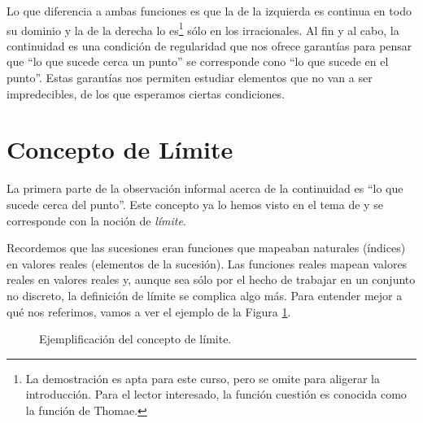 \documentclass[10pt,a4paper,openright]{book}
\theoremstyle{break}
\begin{document}
Lo que diferencia a ambas funciones es que la de la izquierda es continua en todo su dominio y la de la derecha lo es\footnote{La demostración es apta para este curso, pero se omite para aligerar la introducción. Para el lector interesado, la función cuestión es conocida como la función de Thomae.} sólo en los irracionales. Al fin y al cabo, la continuidad es una condición de regularidad que nos ofrece garantías para pensar que ``lo que sucede cerca un punto'' se corresponde cono ``lo que sucede en el punto''. Estas garantías nos permiten estudiar elementos que no van a ser impredecibles, de los que esperamos ciertas condiciones.

\section{Concepto de Límite}
La primera parte de la observación informal acerca de la continuidad es ``lo que sucede cerca del punto''. Este concepto ya lo hemos visto en el tema de  y se corresponde con la noción de \textit{límite}.

Recordemos que las sucesiones eran funciones que mapeaban naturales (índices) en valores reales (elementos de la sucesión). Las funciones reales mapean valores reales en valores reales y, aunque sea sólo por el hecho de trabajar en un conjunto no discreto, la definición de límite se complica algo más. Para entender mejor a qué nos referimos, vamos a ver el ejemplo de la Figura \ref{fig:ejem_limite}.

\begin{figure}[h]
\centering
{}
\caption{Ejemplificación del concepto de límite.}
\label{fig:ejem_limite}
\end{figure}
\end{document}
